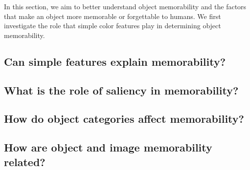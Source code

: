 In this section, we aim to better understand object memorability and the factors that make an object more memorable or forgettable to humans. We first investigate the role that simple color features play in determining object memorability.

\subsection{Can simple features explain memorability?}



\subsection{What is the role of saliency in memorability?}



\subsection{How do object categories affect memorability?}



\subsection{How are object and image memorability related?}

 